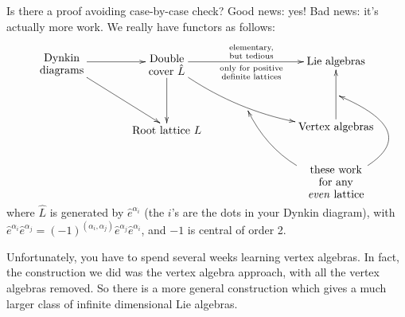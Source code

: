  Is there a proof avoiding case-by-case check? Good news: yes! Bad news: it's actually
 more work. We really have functors as follows:
 \[\xymatrix @R=3.75em @C=3.75em{
   \txt{Dynkin\\ diagrams} \ar[r] \ar[dr] & \txt{Double\\ cover $\hat L$} \ar[d]
   \ar[rr]^{\mbox{\scriptsize\txt{elementary,\\ but tedious}}}_{\mbox{\scriptsize\txt{only for positive\\ definite lattices}}}
   \ar@/_1.25em/[rrd]_{}="a"
   & & \text{Lie algebras}\\
   & \txt{Root lattice $L$} & & \text{Vertex algebras} \ar[u]^{}="b"\\
   & & & {}\save[]*\txt<6pc>{these work\\ for any\\ \emph{even} lattice} \ar@/^1.25em/
 "a" \ar@/_4.75em/ "b" \restore }
 \]
 where $\hat L$ is generated by $\hat e^{\alpha_i}$
 (the $i$'s are the dots in your Dynkin diagram), with $\hat e^{\alpha_i}\hat
 e^{\alpha_j}=(-1)^{(\alpha_i,\alpha_j)}\hat e^{\alpha_j}\hat e^{\alpha_i}$, and $-1$
 is central of order 2.

 Unfortunately, you have to spend several weeks learning vertex algebras. In fact, the
 construction we did was the vertex algebra approach, with all the vertex algebras
 removed. So there is a more general construction which gives a much larger class of
 infinite dimensional Lie algebras.

